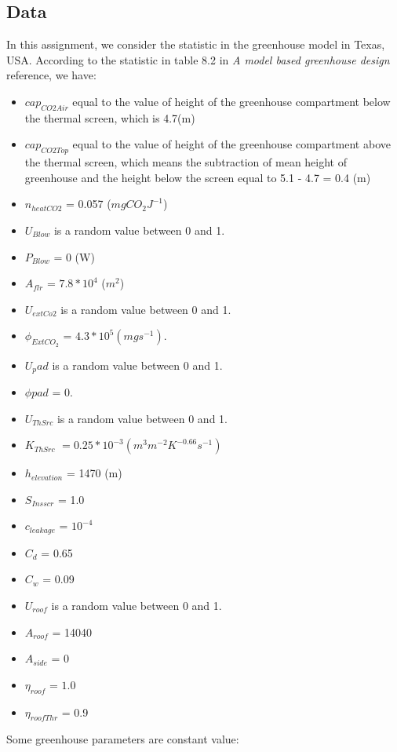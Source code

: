 \documentclass[a4paper]{article}
\numberwithin{equation}{section}
\begin{document}
	\subsection{Data}
In this assignment, we consider the statistic in the greenhouse model in Texas, USA. According to the statistic in table 8.2 in \emph{A model based greenhouse design} reference, we have:
\begin{itemize}
    \item $cap_{CO2Air}$ equal to the value of height of the greenhouse compartment below the thermal screen, which is 4.7(m)
    \item $cap_{CO2Top}$ equal to the value of height of the greenhouse compartment above the thermal screen, which means the subtraction of mean height of greenhouse and the height below the screen equal to 5.1 - 4.7 = 0.4 (m)
    \item $n_{heatCO2}$ = 0.057 ($mgCO_2J^{-1}$)
    \item $U_{Blow}$ is a random value between 0 and 1.
    \item $P_{Blow}$ = 0 (W)
    \item $A_{flr}$ = $7.8*10^4$ ($m^2$)
    \item $U_{extCo2}$ is a random value between 0 and 1.
    \item $\phi _{ExtCO_2}$ = $4.3*10^5 (mgs^{-1})$.
    \item $U_pad$ is a random value between 0 and 1.
    \item $\phi pad$ = 0.
    \item $U_{ThSrc}$ is a random value between 0 and 1.
    \item $K_{ThSrc}$ $= 0.25*10^{-3}(m^{3}m^{-2}K^{-0.66}s^{-1})$
    \item $h_{elevation}$ = 1470 (m)
    \item $S_{Insscr}$ = 1.0
    \item $c_{leakage}$ = $10^{-4}$ 
    \item $C_d$ = 0.65
    \item $C_w$ = 0.09
    \item $U_{roof}$ is a random value between 0 and 1.
    \item $A_{roof}$ = 14040
    \item $A_{side}$ = 0
    \item $\eta_{roof}$ = $1.0$
    \item $\eta_{roofThr}$ = 0.9
    
\end{itemize}
Some greenhouse parameters are constant value:
\end{document}
